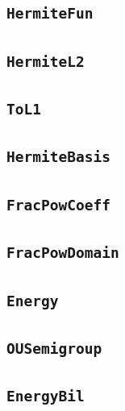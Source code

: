 \documentclass[11pt]{amsart}
\theoremstyle{definition}
\begin{document}
\subsection{\texorpdfstring{\texttt{HermiteFun}}{HermiteFun}}\label{node:HermiteFun}


\subsection{\texorpdfstring{\texttt{HermiteL2}}{HermiteL2}}\label{node:HermiteL2}


\subsection{\texorpdfstring{\texttt{ToL1}}{ToL1}}\label{node:ToL1}


\subsection{\texorpdfstring{\texttt{HermiteBasis}}{HermiteBasis}}\label{node:HermiteBasis}


\subsection{\texorpdfstring{\texttt{FracPowCoeff}}{FracPowCoeff}}\label{node:FracPowCoeff}


\subsection{\texorpdfstring{\texttt{FracPowDomain}}{FracPowDomain}}\label{node:FracPowDomain}


\subsection{\texorpdfstring{\texttt{Energy}}{Energy}}\label{node:Energy}


\subsection{\texorpdfstring{\texttt{OUSemigroup}}{OUSemigroup}}\label{node:OUSemigroup}


\subsection{\texorpdfstring{\texttt{EnergyBil}}{EnergyBil}}\label{node:EnergyBil}

\end{document}
